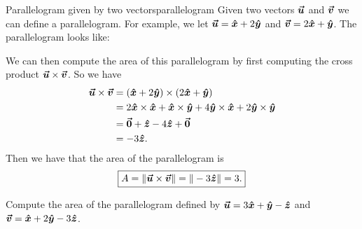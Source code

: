         \begin{ex}{Parallelogram given by two vectors}{parallelogram}
        Given two vectors $\vecu$ and $\vecv$ we can define a parallelogram.  For example, we let $\vecu=\xhat + 2\yhat$ and $\vecv = 2\xhat + \yhat$. The parallelogram looks like:
        \begin{center}
        \end{center}
        We can then compute the area of this parallelogram by first computing the cross product $\vecu \times \vecv$.  So we have
        \begin{align*}
        \vecu \times \vecv &= (\xhat + 2\yhat)\times(2\xhat + \yhat)\\
        &= 2\xhat \times \xhat + \xhat \times \yhat + 4 \yhat \times \xhat + 2\yhat \times \yhat \\
        &= \zerovec + \zhat - 4\zhat + \zerovec\\
        &= -3\zhat.
        \end{align*}
        Then we have that the area of the parallelogram is
        \[
        \boxed{A = \|\vecu \times \vecv\| = \|-3 \zhat\| = 3.}
        \]
        \end{ex}
        
        \begin{exercise}
        Compute the area of the parallelogram defined by $\vecu=3\xhat + \yhat -\zhat$ and $\vecv=\xhat + 2\yhat -3\zhat$.
        \end{exercise}
        
        
